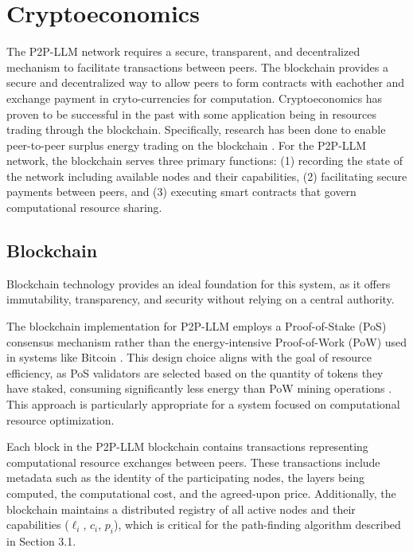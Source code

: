 \documentclass[preprint,twoside,11pt]{article}
\begin{document}
\section{Cryptoeconomics}
The P2P-LLM network requires a secure, transparent, and decentralized mechanism to facilitate transactions between peers.
The blockchain provides a secure and decentralized way to allow peers to form contracts with eachother
and exchange payment in cryto-currencies for computation.
Cryptoeconomics has proven to be successful in the past with some application being in
resources trading through the blockchain. Specifically, research has been done to enable peer-to-peer surplus energy trading on the blockchain \citep{WONGTHONGTHAM2021107299}.
For the P2P-LLM network, the blockchain serves three primary functions: (1) recording the state of the network including available nodes and their capabilities, (2) facilitating secure payments between peers, and (3) executing smart contracts that govern computational resource sharing.

\subsection{Blockchain}

Blockchain technology provides an ideal foundation for this system, as it offers immutability, transparency, and security without relying on a central authority.

The blockchain implementation for P2P-LLM employs a Proof-of-Stake (PoS) consensus mechanism rather than the energy-intensive Proof-of-Work (PoW) used in systems like Bitcoin \citep{nakamoto2008bitcoin}. This design choice aligns with the goal of resource efficiency, as PoS validators are selected based on the quantity of tokens they have staked, consuming significantly less energy than PoW mining operations \citep{saleh2021blockchain}. This approach is particularly appropriate for a system focused on computational resource optimization.

Each block in the P2P-LLM blockchain contains transactions representing computational resource exchanges between peers. These transactions include metadata such as the identity of the participating nodes, the layers being computed, the computational cost, and the agreed-upon price. Additionally, the blockchain maintains a distributed registry of all active nodes and their capabilities ($\ell_i$, $c_i$, $p_i$), which is critical for the path-finding algorithm described in Section 3.1.
\end{document}
